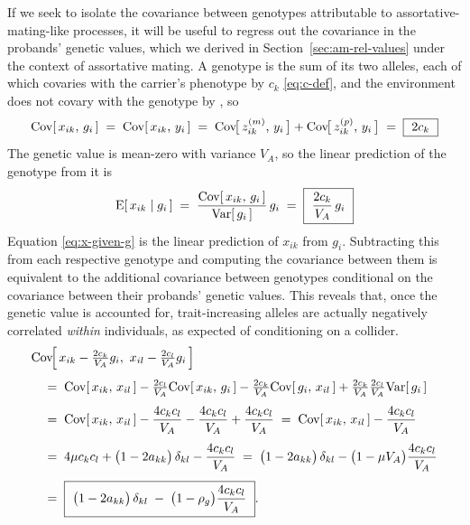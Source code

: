 \documentclass[12pt]{article}
\begin{document}
If we seek to isolate the covariance between genotypes attributable to assortative-mating-like processes, it will be useful to regress out the covariance in the probands' genetic values, which we derived in Section~\ref{sec:am-rel-values} under the context of assortative mating.
A genotype is the sum of its two alleles, each of which covaries with the carrier's phenotype by $c_k$ \eqref{eq:c-def}, and the environment does not covary with the genotype by , so
\begin{equation}\label{eq:x-g-within}
    \mathrm{Cov}[\,x_{ik},\, g_i\,] \;=\; \mathrm{Cov}[\,x_{ik},\, y_i\,]
    \;=\; \mathrm{Cov}\!\big[\,z^{(m)}_{ik},\, y_i\,\big] + \mathrm{Cov}\!\big[\,z^{(p)}_{ik},\, y_i\,\big]
    \;=\; \boxed{\ 2c_k\ }
\end{equation}
The genetic value is mean-zero with variance $V_A$, so the linear prediction of the genotype from it is
\begin{equation}\label{eq:x-given-g}
    \mathrm{E}[\,x_{ik} \mid g_i\,] \;=\; \frac{\mathrm{Cov}[\,x_{ik},\, g_i\,]}{\mathrm{Var}[\,g_i\,]}\, g_i
    \;=\; \boxed{\ \frac{2c_k}{V_A}\, g_i\ }
\end{equation}
Equation \eqref{eq:x-given-g} is the linear prediction of $x_{ik}$ from $g_i$.
Subtracting this from each respective genotype and computing the covariance between them is equivalent to the additional covariance between genotypes conditional on the covariance between their probands' genetic values.
This reveals that, once the genetic value is accounted for, trait-increasing alleles are actually negatively correlated \emph{within} individuals, as expected of conditioning on a collider.
\begin{equation}\label{eq:x-resid-within}
\begin{aligned}
    &\mathrm{Cov}\!\Big[\,x_{ik} - \tfrac{2c_k}{V_A} g_i,\ x_{il} - \tfrac{2c_l}{V_A} g_i\,\Big] \\[4pt]
    &\quad=\; \mathrm{Cov}[\,x_{ik},\, x_{il}\,]
    - \tfrac{2c_l}{V_A}\mathrm{Cov}[\,x_{ik},\, g_i\,]
    - \tfrac{2c_k}{V_A}\mathrm{Cov}[\,g_i,\, x_{il}\,]
    + \tfrac{2c_k}{V_A}\tfrac{2c_l}{V_A}\mathrm{Var}[\,g_i\,] \\[4pt]
    &\quad=\; \mathrm{Cov}[\,x_{ik},\, x_{il}\,] - \frac{4c_k c_l}{V_A} - \frac{4c_k c_l}{V_A} + \frac{4c_k c_l}{V_A}
    \;=\; \mathrm{Cov}[\,x_{ik},\, x_{il}\,] - \frac{4c_k c_l}{V_A} \\[4pt]
    &\quad=\; 4\mu c_k c_l + \big(1 - 2a_{kk}\big)\,\delta_{kl} - \frac{4c_k c_l}{V_A}
    \;=\; \big(1 - 2a_{kk}\big)\,\delta_{kl} - \big(1 - \mu V_A\big)\frac{4c_k c_l}{V_A} \\[4pt]
    &\quad=\; \boxed{\ \big(1 - 2a_{kk}\big)\,\delta_{kl} \;-\; \big(1-\rho_g\big)\frac{4c_k c_l}{V_A}\ } .
\end{aligned}
\end{equation}
\end{document}
